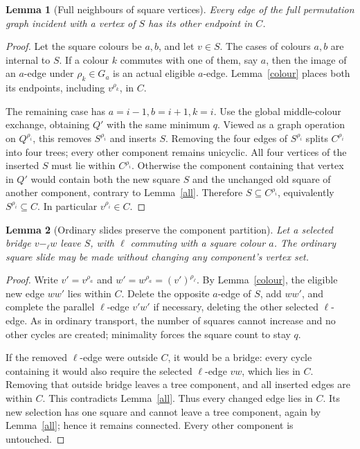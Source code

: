 \documentclass[11pt,a4paper]{article}
\newtheorem{lemma}{Lemma}
\begin{document}
\begin{lemma}[Full neighbours of square vertices]\label{neighbour}
Every edge of the full permutation graph incident with a vertex of
$S$ has its other endpoint in $C$.
\end{lemma}
\begin{proof}
Let the square colours be $a,b$, and let $v\in S$. The cases of
colours $a,b$ are internal to $S$. If a colour $k$ commutes with
one of them, say $a$, then the image of an $a$-edge under
$\rho_k\in G_a$ is an actual eligible $a$-edge. Lemma~\ref{colour}
places both its endpoints, including $v^{\rho_k}$, in $C$.

The remaining case has $a=i-1,b=i+1,k=i$. Use the global
middle-colour exchange, obtaining $Q'$ with the same minimum $q$.
Viewed as a graph operation on $Q^{\rho_i}$, this removes
$S^{\rho_i}$ and inserts $S$. Removing the four edges of
$S^{\rho_i}$ splits $C^{\rho_i}$ into four trees; every other
component remains unicyclic. All four vertices of the inserted
$S$ must lie within $C^{\rho_i}$. Otherwise the component containing
that vertex in $Q'$ would contain both the new square $S$ and the
unchanged old square of another component, contrary to
Lemma~\ref{all}. Therefore $S\subseteq C^{\rho_i}$, equivalently
$S^{\rho_i}\subseteq C$. In particular $v^{\rho_i}\in C$.
\end{proof}

\begin{lemma}[Ordinary slides preserve the component partition]
Let a selected bridge $v\mathrel{-_\ell}w$ leave $S$, with $\ell$
commuting with a square colour $a$. The ordinary square slide may
be made without changing any component's vertex set.
\end{lemma}
\begin{proof}
Write $v'=v^{\rho_a}$ and $w'=w^{\rho_a}=(v')^{\rho_\ell}$.
By Lemma~\ref{colour}, the eligible new edge $ww'$ lies within $C$.
Delete the opposite $a$-edge of $S$, add $ww'$, and complete the
parallel $\ell$-edge $v'w'$ if necessary, deleting the other
selected $\ell$-edge. As in ordinary transport, the number of
squares cannot increase and no other cycles are created; minimality
forces the square count to stay $q$.

If the removed $\ell$-edge were outside $C$, it would be a bridge:
every cycle containing it would also require the selected
$\ell$-edge $vw$, which lies in $C$. Removing that outside bridge
leaves a tree component, and all inserted edges are within $C$.
This contradicts Lemma~\ref{all}. Thus every changed edge lies in
$C$. Its new selection has one square and cannot leave a tree
component, again by Lemma~\ref{all}; hence it remains connected.
Every other component is untouched.
\end{proof}
\end{document}

